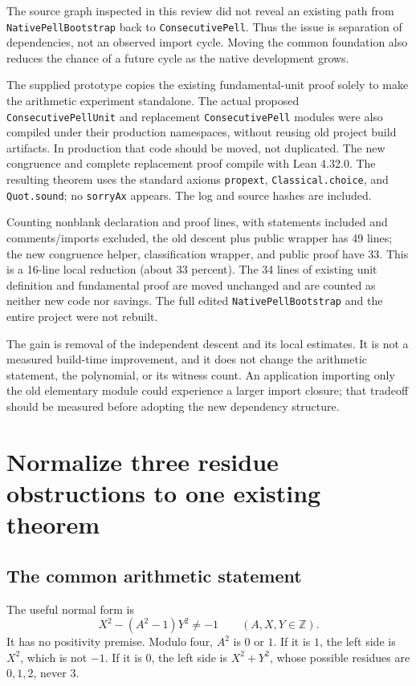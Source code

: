 \documentclass[11pt,letterpaper]{article}
\newcommand{\code}[1]{\nolinkurl{#1}}
\newcommand{\Z}{\mathbb Z}
\begin{document}
The source graph inspected in this review did not reveal an existing path from \code{NativePellBootstrap} back to \code{ConsecutivePell}. Thus the issue is separation of dependencies, not an observed import cycle. Moving the common foundation also reduces the chance of a future cycle as the native development grows.

The supplied prototype copies the existing fundamental-unit proof solely to make the arithmetic experiment standalone. The actual proposed \code{ConsecutivePellUnit} and replacement \code{ConsecutivePell} modules were also compiled under their production namespaces, without reusing old project build artifacts. In production that code should be moved, not duplicated. The new congruence and complete replacement proof compile with Lean 4.32.0. The resulting theorem uses the standard axioms \code{propext}, \code{Classical.choice}, and \code{Quot.sound}; no \code{sorryAx} appears. The log and source hashes are included.

Counting nonblank declaration and proof lines, with statements included and comments/imports excluded, the old descent plus public wrapper has 49 lines; the new congruence helper, classification wrapper, and public proof have 33. This is a 16-line local reduction (about 33 percent). The 34 lines of existing unit definition and fundamental proof are moved unchanged and are counted as neither new code nor savings. The full edited \code{NativePellBootstrap} and the entire project were not rebuilt.

The gain is removal of the independent descent and its local estimates. It is not a measured build-time improvement, and it does not change the arithmetic statement, the polynomial, or its witness count. An application importing only the old elementary module could experience a larger import closure; that tradeoff should be measured before adopting the new dependency structure.

\section{Normalize three residue obstructions to one existing theorem}
\label{sec:discriminant}

\subsection{The common arithmetic statement}

The useful normal form is
\begin{equation}
 X^2-(A^2-1)Y^2\ne-1 \qquad(A,X,Y\in\Z). \label{eq:common-obstruction}
\end{equation}
It has no positivity premise. Modulo four, $A^2$ is $0$ or $1$. If it is $1$, the left side is $X^2$, which is not $-1$. If it is $0$, the left side is $X^2+Y^2$, whose possible residues are $0,1,2$, never $3$.
\end{document}
